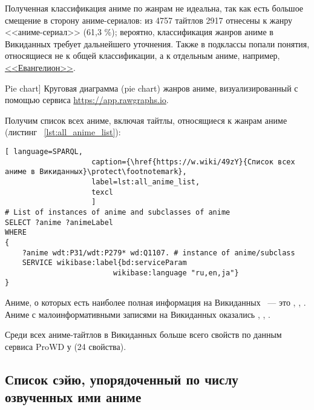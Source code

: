 Полученная классификация аниме по жанрам не идеальна, так как есть большое смещение в сторону аниме-сериалов: из 4757 тайтлов 2917 отнесены к жанру <<аниме-сериал>> (61,3 \%); вероятно, классификация жанров аниме в Викиданных требует дальнейшего уточнения. Также в подклассы попали понятия, относящиеся не к общей классификации, а к отдельным аниме, например, \href{https://w.wiki/4L5p}{<<Евангелион>>}.

\begin{marginfigure}[0.0cm]
{
	\setlength{\fboxsep}{0pt}%
	\setlength{\fboxrule}{1pt}%
}
\caption
[Pie chart]
{
Круговая диаграмма (pie chart) жанров аниме, визуализированный с помощью сервиса \href{https://app.rawgraphs.io}{https://app.rawgraphs.io}.\newline
}
\label{fig:anime_piechart}
\end{marginfigure}

Получим список всех аниме, включая тайтлы, относящиеся к жанрам аниме (листинг ~\protect\ref{lst:all_anime_list}):

\begin{lstlisting}[ language=SPARQL, 
                    caption={\href{https://w.wiki/49zY}{Список всех аниме в Викиданных}\protect\footnotemark},
                    label=lst:all_anime_list,
                    texcl 
                    ]
# List of instances of anime and subclasses of anime
SELECT ?anime ?animeLabel
WHERE
{
    ?anime wdt:P31/wdt:P279* wd:Q1107. # instance of anime/subclass
    SERVICE wikibase:label{bd:serviceParam
					     wikibase:language "ru,en,ja"}
}
\end{lstlisting}%

Аниме, о которых есть наиболее полная информация на Викиданных ~--- это , , . Аниме с малоинформативными записями на Викиданных оказались , , .

Среди всех аниме-тайтлов в Викиданных больше всего свойств по данным сервиса ProWD\cite{anime_prowd} у  (24 свойства).

\subsection{Список сэйю, упорядоченный по числу озвученных ими аниме}

